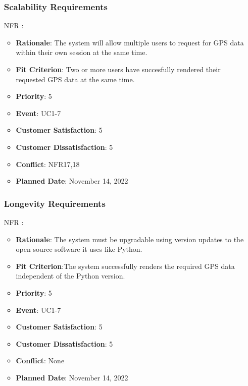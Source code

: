 \documentclass[12pt, titlepage]{article}
\newcounter{reqnum} %
\newcounter{freqnum} %
\begin{document}
\begin{itemize}
\subsubsection{Scalability Requirements}
\item[NFR\refstepcounter{freqnum}\thefreqnum
\label{NFR}:] 
\begin{itemize}
    \item \textbf{Rationale}: The system will allow multiple users to request for GPS data within their own session at the same time.
    \item \textbf{Fit Criterion}: Two or more users have succesfully rendered their requested GPS data at the same time.
    \item \textbf{Priority}: 5
    \item \textbf{Event}: UC1-7%
    \item \textbf{Customer Satisfaction}: 5
    \item \textbf{Customer Dissatisfaction}: 5
    \item \textbf{Conflict}: NFR17,18
    \item \textbf{Planned Date}: November 14, 2022
\end{itemize}
\subsubsection{Longevity Requirements}
\item[NFR\refstepcounter{freqnum}\thefreqnum
\label{NFR}:] 
\begin{itemize}
    \item \textbf{Rationale}: The system must be upgradable using version updates to the open source software it uses like Python.
    \item \textbf{Fit Criterion}:The system successfully renders the required GPS data independent of the Python version.
    \item \textbf{Priority}: 5
    \item \textbf{Event}: UC1-7%
    \item \textbf{Customer Satisfaction}: 5
    \item \textbf{Customer Dissatisfaction}: 5
    \item \textbf{Conflict}: None
    \item \textbf{Planned Date}: November 14, 2022
\end{itemize}

\end{itemize}
\end{document}
